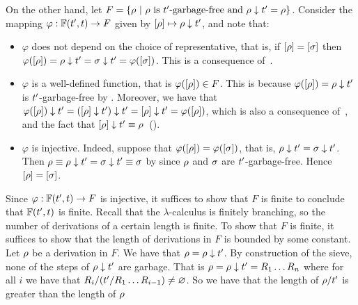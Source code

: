 \begin{enumerate}
\begin{enumerate}
    On the other hand, let $F = \{\rho \ |\  \rho \text{ is $t'$-garbage-free and } \rho \downarrow t' = \rho\}$.
    Consider the mapping $\varphi : \mathbb{F}(t', t) \to F$
    given by ${[\rho]} \mapsto \rho \downarrow t'$, and note that:
    \begin{itemize}
    \item
      $\varphi$ does not depend on the choice of representative,
      that is, if ${[\rho]} = {[\sigma]}$ then $\varphi({[\rho]}) = \rho \downarrow t' = \sigma \downarrow t' = \varphi({[\sigma]})$.
      This is a consequence of~.
    \item
      $\varphi$ is a well-defined function, that is $\varphi({[\rho]}) \in F$.
      This is because $\varphi({[\rho]}) = \rho \downarrow t'$ is $t'$-garbage-free by .
      Moreover, we have that $\varphi({[\rho]}) \downarrow t' = ({[\rho]} \downarrow t') \downarrow t' = {[\rho]} \downarrow t'= \varphi({[\rho]})$,
      which is also a consequence of~,
      and the fact that ${[\rho]} \downarrow t' \equiv \rho$~().
    \item
      $\varphi$ is injective. Indeed, suppose that $\varphi({[\rho]}) = \varphi({[\sigma]})$,
      that is, $\rho \downarrow t' = \sigma \downarrow t'$.
      Then $\rho \equiv \rho \downarrow t' = \sigma \downarrow t' \equiv \sigma$
      by  since $\rho$ and $\sigma$ are $t'$-garbage-free.
      Hence ${[\rho]} = {[\sigma]}$.
    \end{itemize}
    Since $\varphi : \mathbb{F}(t', t) \to F$ is injective, it suffices to show that $F$ is finite
    to conclude that $\mathbb{F}(t', t)$ is finite.
    Recall that the $\lambda$-calculus is finitely branching, so the number of derivations of a certain length
    is finite. To show that $F$ is finite, it suffices to show that the length of derivations in $F$ is
    bounded by some constant.
    Let $\rho$ be a derivation in $F$. We have that $\rho = \rho \downarrow t'$.
    By construction of the sieve, none of the steps of $\rho \downarrow t'$ are garbage.
    That is $\rho = \rho \downarrow t' = R_1\hdots R_n$ where for all $i$ we have that
    $R_i/(t'/R_1\hdots R_{i-1}) \neq \varnothing$.
    So we have that the length of $\rho/t'$ is greater than the length of $\rho$

\end{enumerate}
\end{enumerate}
